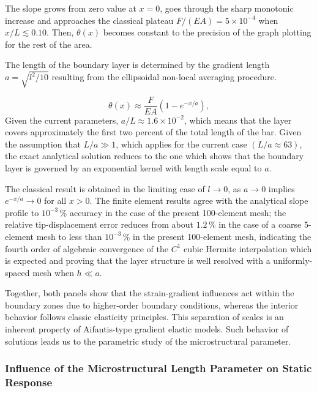 \documentclass[final,3p,times,fleqn]{elsarticle}
\begin{document}
The slope grows from zero value at $x=0$, goes through the sharp monotonic
increase and approaches the classical plateau $F/(EA)=5 \times 10^{-4}$
when $x/L \lesssim 0.10$. 
Then, $\theta(x)$ becomes constant to the precision of the graph
plotting for the rest of the area. 

The length of the boundary layer is determined by the gradient length 
$a = \sqrt{l^{2}/10}$ resulting from the ellipsoidal non-local averaging procedure.

\begin{equation}
  \theta(x) \approx \frac{F}{EA}\!\left(1 - e^{-x/a}\right),
  \label{eq:theta_approx}
\end{equation}
Given the current parameters, $a/L \approx 1.6 \times 10^{-2}$, which means that the layer covers approximately the first two percent of the total length of the bar. Given the assumption that $L/a \gg 1$, which applies for the current case $(L/a \approx 63)$,
the exact analytical solution reduces to the one which shows that the boundary layer is governed by an exponential
kernel with length scale equal to $a$.

The classical result is obtained in the limiting case of $l \to 0$, as $a \to 0$ implies $e^{-x/a} \to 0$ for all $x > 0$.
The finite element results agree with the analytical slope profile
to $10^{-3}\,\%$ accuracy in the case of the present 100-element
mesh; the relative tip-displacement error reduces from about
$1.2\,\%$ in the case of a coarse 5-element mesh to less than
$10^{-3}\,\%$ in the present 100-element mesh, indicating the
fourth order of algebraic convergence of the $C^{1}$ cubic Hermite
interpolation which is expected and proving that the layer structure
is well resolved with a uniformly-spaced mesh when $h \ll a$.

Together, both panels show that the strain-gradient influences act within the
boundary zones due to higher-order boundary conditions, whereas the
interior behavior follows classic elasticity principles. This separation of
scales is an inherent property of Aifantis-type gradient elastic models.
Such behavior of solutions leads us to the parametric study of the
microstructural parameter.

\subsubsection{Influence of the Microstructural Length Parameter on
        Static Response}
\label{sec:micro_length_effect}
\end{document}
